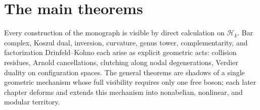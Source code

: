 \section{The main theorems}
\label{sec:frame-construction}

Every construction of the monograph is visible by direct calculation
on $\mathcal{H}_k$. Bar complex, Koszul dual, inversion, curvature,
genus tower, complementarity, and factorization Drinfeld--Kohno each
arise as explicit geometric acts: collision residues, Arnold
cancellations, clutching along nodal degenerations, Verdier duality on
configuration spaces. The general theorems are shadows of a single
geometric mechanism whose full visibility requires only one free boson;
each later chapter deforms and extends this mechanism into nonabelian,
nonlinear, and modular territory.

